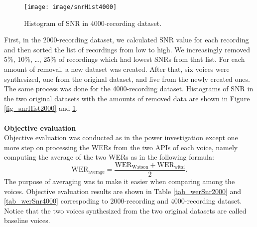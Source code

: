 \documentclass[12pt]{article}
\begin{document}
\begin{figure}[t]
\begin{center}
\texttt{[image: image/snrHist4000]}
\end{center}
\vspace{-0.3cm}
\caption[Histogram of SNR in 4000-recording dataset.]{Histogram of SNR in 4000-recording dataset.}
\label{fig_snrHist4000}
\end{figure}

First, in the 2000-recording dataset, we calculated SNR value for each recording and then sorted the list of recordings from low to high. We increasingly removed 5\%, 10\%, …, 25\% of recordings which had lowest SNRs from that list. For each amount of removal, a new dataset was created. After that, six voices were synthesized, one from the original dataset, and five from the newly created ones. The same process was done for the 4000-recording dataset. Histograms of SNR in the two original datasets with the amounts of removed data are shown in Figure \ref{fig_snrHist2000} and \ref{fig_snrHist4000}.\\\\
\textbf{Objective evaluation}
\vspace{0.28cm}\\
Objective evaluation was conducted as in the power investigation except one more step on processing the WERs from the two APIs of each voice, namely computing the average of the two WERs as in the following formula:
\begin{equation}\label{exp_averageWer}
    \text{WER}_{\text{average}} = \frac{\text{WER}_{\text{Watson}} + \text{WER}_{\text{witai}}}{2}.
\end{equation}
The purpose of averaging was to make it easier when comparing among the voices. Objective evaluation results are shown in Table \ref{tab_werSnr2000} and \ref{tab_werSnr4000} correspoding to 2000-recording and 4000-recording dataset. Notice that the two voices synthesized from the two original datasets are called baseline voices.
\end{document}
